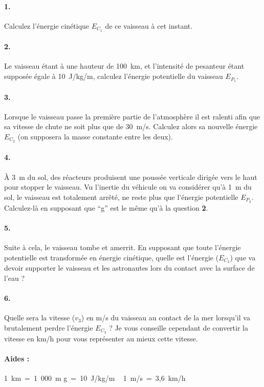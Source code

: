 \documentclass[12pt,a4paper]{article}
\begin{document}
\paragraph{1.} Calculez l'énergie cinétique $E_{C_1}$ de ce vaisseau à cet instant.

\paragraph{2.} Le vaisseau étant à une hauteur de 100~km, et l'intensité de pesanteur étant supposée égale à 10~J/kg/m, calculez l'énergie potentielle du vaisseau $E_{P_1}$.

\paragraph{3.} Lorsque le vaisseau passe la première partie de l'atmosphère il est ralenti afin que sa vitesse de chute ne soit plus que de 30~m/s. Calculez alors sa nouvelle énergie $E_{C_2}$ (on supposera la masse constante entre les deux).

\paragraph{4.} À 3~m du sol, des réacteurs produisent une poussée verticale dirigée vers le haut pour stopper le vaisseau. Vu l'inertie du véhicule on va considérer qu'à 1~m du sol, le vaisseau est totalement arrêté, ne reste plus que l'énergie potentielle $E_{P_3}$. Calculez-là en supposant que ``g'' est le même qu'à la question \textbf{2}.

\paragraph{5.} Suite à cela, le vaisseau tombe et amerrit. En supposant que toute l'énergie potentielle est transformée en énergie cinétique, quelle est l'énergie ($E_{C_3}$) que va devoir supporter le vaisseau et les astronautes lors du contact avec la surface de l'eau ?

\paragraph{6.} Quelle sera la vitesse ($v_3$) en m/s du vaisseau au contact de la mer lorsqu'il va brutalement perdre l'énergie $E_{C_3}$ ? Je vous conseille cependant de convertir la vitesse en km/h pour vous représenter au mieux cette vitesse.

\paragraph*{Aides :} \hfill 1~km~=~1~000~m \hfill g~=~10~J/kg/m \hfill ~ 1~m/s~=~3,6~km/h \hfill ~
\end{document}
